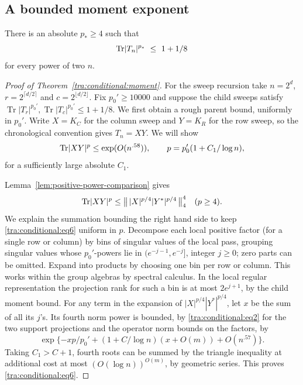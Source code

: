 \subsection{A bounded moment exponent}
\begin{theorem}\label{tra:conditional:moment}
There is an absolute $p_*\ge4$ such that
\begin{equation}
              {\rm Tr}|T_n|^{p_*}\ \le\ 1+1/8                         \label{tra:conditional:eq1}
\end{equation}
for every power of two $n$. 
\end{theorem}
\begin{proof}[Proof of Theorem~\ref{tra:conditional:moment}]
\label{tra:conditional:bounded-moment-induction}
For the sweep recursion take $n=2^d$, $r=2^{\lceil d/2\rceil}$
and $c=2^{\lfloor d/2\rfloor}$. Fix $p_0'\ge10000$ and suppose the child sweeps satisfy
$\operatorname{Tr}|T_r|^{p_0'},\operatorname{Tr}|T_c|^{p_0'}\le1+1/8$.
We first obtain a rough parent bound, uniformly in $p_0'$.
Write $X=K_C$ for the column sweep and $Y=K_R$ for the row sweep,
so the chronological convention gives $T_n=XY$. We will show
\begin{equation}
             {\rm Tr}|XY|^p\le\exp(O(n^{.58})),
       \qquad p=p_0'(1+C_1/\log n),                                     \label{tra:conditional:eq6}
\end{equation}
for a sufficiently large absolute \(C_1\).

Lemma~\ref{lem:positive-power-comparison} gives
\[
            {\rm Tr}|XY|^p \le
                    \big\|\, |X|^{p/4}|Y^*|^{p/4}\,\big\|_4^4
                   \quad(p\ge4).
\]
We explain the summation bounding the right hand side to keep \eqref{tra:conditional:eq6} uniform in \(p\). Decompose each local positive factor (for a single row or column) by bins of singular values of the local pass, grouping singular values whose \(p_0'\)-powers lie in
\((e^{-j-1},e^{-j}]\), integer \(j\ge0\); zero parts can be omitted. Expand into products by choosing one bin per row or column. This works within the group algebras by spectral calculus. In the local regular representation the projection rank for such a bin is at most \(2 e^{j+1}\), by the child moment bound. For any term in the expansion of \(|X|^{p/4}|Y^*|^{p/4}\), let \(x\) be the sum of all its \(j\)'s. Its fourth norm power is bounded, by \eqref{tra:conditional:eq2} for the two support projections and the operator norm bounds on the factors, by
\[
 \exp\{-x p/p_0'+(1+C/\log n)(x+O(m))+O(n^{.57})\}.
\]
Taking \(C_1>C+1\), fourth roots can be summed by the triangle inequality at additional cost at most \((O(\log n))^{O(m)}\), by geometric series. This proves \eqref{tra:conditional:eq6}.


\end{proof}
